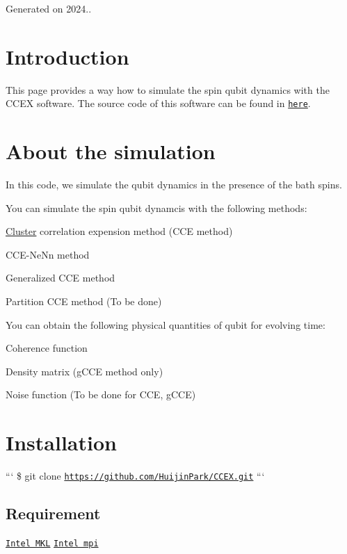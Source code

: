 Generated on 2024..

\section*{Introduction }

This page provides a way how to simulate the spin qubit dynamics with the C\-C\-E\-X software. The source code of this software can be found in \href{https://github.com/HuijinPark/CCEX}{\tt here}.

\section*{About the simulation }

In this code, we simulate the qubit dynamics in the presence of the bath spins.

You can simulate the spin qubit dynamcis with the following methods\-:
\begin{DoxyItemize}
\item \hyperlink{structCluster}{Cluster} correlation expension method (C\-C\-E method)
\item C\-C\-E-\/\-Ne\-Nn method
\item Generalized C\-C\-E method
\item Partition C\-C\-E method (To be done)
\end{DoxyItemize}

You can obtain the following physical quantities of qubit for evolving time\-:
\begin{DoxyItemize}
\item Coherence function
\item Density matrix (g\-C\-C\-E method only)
\item Noise function (To be done for C\-C\-E, g\-C\-C\-E)
\end{DoxyItemize}

\section*{Installation }

``` \$ git clone \href{https://github.com/HuijinPark/CCEX.git}{\tt https\-://github.\-com/\-Huijin\-Park/\-C\-C\-E\-X.\-git} ```

\subsection*{Requirement}

\href{https://www.intel.com/content/www/us/en/developer/tools/oneapi/onemkl.html}{\tt Intel M\-K\-L} \href{https://www.intel.com/content/www/us/en/developer/tools/oneapi/mpi-library.html#gs.b1bib5}{\tt Intel mpi}

